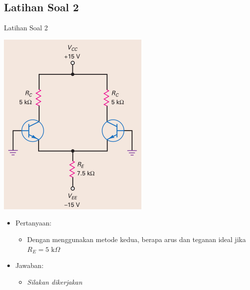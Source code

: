 \documentclass[aspectratio=169]{beamer}
\begin{document}
\subsection{Latihan Soal 2}
\begin{frame}{Latihan Soal 2}
	\begin{multicols}{2}
		\begin{center}
			\includegraphics[width=0.6\textheight]{gambar/01.latihan_soal_1a}
		\end{center}
		\columnbreak
		\begin{itemize}
			\item Pertanyaan:
			\begin{itemize}
				\item Dengan menggunakan metode kedua, berapa arus dan teganan ideal jika $ R_E = 5 \text{ k}\Omega $
			\end{itemize}
			\item Jawaban:
			\begin{itemize}
				\item \textit{Silakan dikerjakan}
			\end{itemize}
		\end{itemize}
		\vfill\null
	\end{multicols}
\end{frame}
\end{document}
